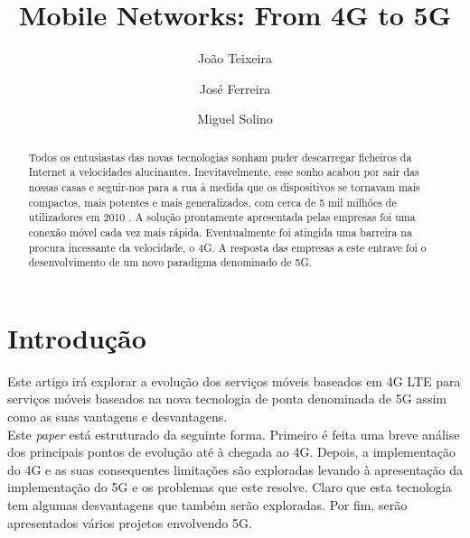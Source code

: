 \documentclass{llncs}
\begin{document}
\mainmatter
\title{Mobile Networks: From 4G to 5G}


\author{João Teixeira \and José Ferreira \and Miguel Solino}



\date{}


\maketitle
\begin{abstract}
Todos os entusiastas das novas tecnologias sonham puder descarregar
ficheiros da Internet a velocidades alucinantes.
Inevitavelmente, esse sonho acabou por sair das nossas casas e
seguir-nos para a rua à medida que os dispositivos se tornavam mais
compactos, mais potentes e mais generalizados, com cerca de 5 mil
milhões de utilizadores em 2010 \cite{Upkar12}.
A solução prontamente apresentada pelas empresas foi uma conexão
móvel cada vez mais rápida.
Eventualmente foi atingida uma barreira na procura incessante da
velocidade, o 4G. A resposta das empresas a este entrave foi o
desenvolvimento de um novo paradigma denominado de 5G.
\end{abstract}

\section{Introdução}

Este artigo irá explorar a evolução dos serviços móveis baseados em 4G
LTE para serviços móveis baseados na nova tecnologia de ponta
denominada de 5G assim como as suas vantagens e desvantagens.\\
Este \textit{paper} está estruturado da seguinte forma. Primeiro é 
feita uma breve análise dos principais pontos de evolução até à 
chegada ao 4G. Depois, a implementação do 4G e as suas consequentes 
limitações são exploradas levando à apresentação da implementação do 5G
e os problemas que este resolve.
Claro que esta tecnologia tem algumas desvantagens que também serão 
exploradas.
Por fim, serão apresentados vários projetos envolvendo 5G.
\end{document}
